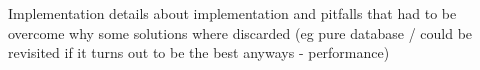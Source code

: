 
Implementation
	details about implementation and pitfalls that had to be overcome
	why some solutions where discarded (eg pure database / could be revisited if it turns out to be the best anyways - performance)
